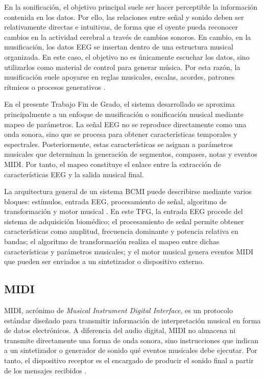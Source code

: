 \documentclass[../main.tex]{subfiles}
\begin{document}
En la sonificación, el objetivo principal suele ser hacer perceptible la información contenida en los datos. Por ello, las relaciones entre señal y sonido deben ser relativamente directas e intuitivas, de forma que el oyente pueda reconocer cambios en la actividad cerebral a través de cambios sonoros. En cambio, en la musificación, los datos EEG se insertan dentro de una estructura musical organizada. En este caso, el objetivo no es únicamente escuchar los datos, sino utilizarlos como material de control para generar música. Por esta razón, la musificación suele apoyarse en reglas musicales, escalas, acordes, patrones rítmicos o procesos generativos \cite{EatonMiranda2014Mapping}.

En el presente Trabajo Fin de Grado, el sistema desarrollado se aproxima principalmente a un enfoque de musificación o sonificación musical mediante mapeo de parámetros. La señal EEG no se reproduce directamente como una onda sonora, sino que se procesa para obtener características temporales y espectrales. Posteriormente, estas características se asignan a parámetros musicales que determinan la generación de segmentos, compases, notas y eventos MIDI. Por tanto, el mapeo constituye el enlace entre la extracción de características EEG y la salida musical final.

La arquitectura general de un sistema BCMI puede describirse mediante varios bloques: estímulos, entrada EEG, procesamiento de señal, algoritmo de transformación y motor musical \cite{EatonMiranda2014Mapping}. En este TFG, la entrada EEG procede del sistema de adquisición biomédico; el procesamiento de señal permite obtener características como amplitud, frecuencia dominante y potencia relativa en bandas; el algoritmo de transformación realiza el mapeo entre dichas características y parámetros musicales; y el motor musical genera eventos MIDI que pueden ser enviados a un sintetizador o dispositivo externo.

\subsection{MIDI}

MIDI, acrónimo de \textit{Musical Instrument Digital Interface}, es un protocolo estándar diseñado para transmitir información de interpretación musical en forma de datos electrónicos. A diferencia del audio digital, MIDI no almacena ni transmite directamente una forma de onda sonora, sino instrucciones que indican a un sintetizador o generador de sonido qué eventos musicales debe ejecutar. Por tanto, el dispositivo receptor es el encargado de producir el sonido final a partir de los mensajes recibidos \cite{Heckroth1995}.
\end{document}
